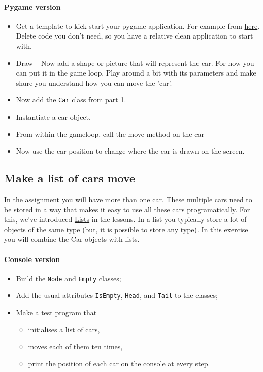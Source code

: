         \paragraph*{Pygame version}
        \begin{itemize}
            \item Get a template to kick-start your pygame application.
            For example from \href{http://openbookproject.net/thinkcs/python/english3e/pygame.html}{here}.
            Delete code you don't need, so you have a relative clean application to start with.
            \item Draw -- Now add a shape or picture that will represent the car.
            For now you can put it in the game loop.
            Play around a bit with its parameters and make shure you understand how you can move the 'car'.
            \item Now add the \texttt{Car} class from part 1.
            \item Instantiate a car-object.
            \item From within the gameloop, call the move-method on the car
            \item Now use the car-position to change where the car is drawn on the screen.
        \end{itemize}



    \subsection{Make a list of cars move}
        In the assignment you will have more than one car.
        These multiple cars need to be stored in a way that makes it easy to use all these cars programatically.
        For this, we've introduced \href{https://github.com/hogeschool/INFDEV02-2/raw/master/Slides/Lecture%20II%20-%20lists.pdf}{Lists} in the lessons.
            In a list you typically store a lot of objects of the same type (but, it is possible to store any type).
            In this exercise you will combine the Car-objects with lists.
        \paragraph*{Console version}
        \begin{itemize}
            \item Build the \texttt{Node} and \texttt{Empty} classes;
            \item Add the usual attributes \texttt{IsEmpty}, \texttt{Head}, and \texttt{Tail} to the classes;
            \item Make a test program that
            \begin{itemize}
                \item initialises a list of cars,
                \item moves each of them ten times,
                \item print the position of each car on the console at every step.
            \end{itemize}
        \end{itemize}

